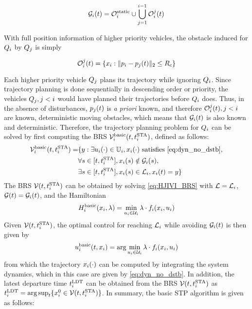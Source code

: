 \begin{equation}
\label{eq:obsseti}
\obsset_i(t)  = \soset_i \cup \bigcup_{j=1}^{i-1} \ioset_i^j(t)
\end{equation}

With full position information of higher priority vehicles, the obstacle induced for $Q_i$ by $Q_j$ is simply

\begin{equation}
\label{eq:ioset}
\ioset_i^j(t) = \{\state_i: \|\pos_i - \pos_j(t)\|_2 \le \rc \}
\end{equation}

Each higher priority vehicle $Q_j$ plans its trajectory while ignoring $Q_i$. Since trajectory planning is done sequentially in descending order or priority, the vehicles $Q_j, j<i$ would have planned their trajectories before $Q_i$ does. Thus, in the absence of disturbances, $p_j(t)$ is \textit{a priori} known, and therefore $\mathcal{O}_i^j(t), j<i$ are known, deterministic moving obstacles, which means that $\mathcal{G}_i(t)$ is also known and deterministic. Therefore, the trajectory planning problem for $Q_i$ can be solved by first computing the BRS $\mathcal{V}_i^\text{basic}(t, t^\text{STA}_i)$, defined as follows:
%
\begin{equation}
\label{eq:BRS_basic}
\begin{aligned}
\brs_i^\text{basic}(t, \sta_i) = & \{y: \exists \ctrl_i(\cdot) \in \cfset_i, \state_i(\cdot) \text{ satisfies \eqref{eq:dyn_no_dstb}}, \\
& \forall s \in [t, \sta_i],\state_i(s) \notin \obsset_i(s), \\
& \exists s \in [t, \sta_i], \state_i(s) \in \targetset_i, \state_i(t) = y\}
\end{aligned}
\end{equation}
%
The BRS $\mathcal{V}(t, t^\text{STA}_i)$ can be obtained by solving \eqref{eq:HJIVI_BRS} with $\mathcal{L} = \mathcal{L}_i$, $\mathcal{G}(t) = \mathcal{G}_i(t)$, and the Hamiltonian 
%
\begin{equation}
\label{eq:basicham}
\ham_i^\text{basic}(\state_i, \costate) = \min_{\ctrl_i\in\cset_i} \costate \cdot \fdyn_i(\state_i, \ctrl_i)
\end{equation}
%
 Given $\mathcal{V}(t, t^\text{STA}_i)$, the optimal control for reaching $\mathcal{L}_i$ while avoiding $\mathcal{G}_i(t)$ is then given by
%
\begin{equation}
\label{eq:basicOptCtrl}
\ctrl_i^\text{basic}(t, \state_i) = \arg \min_{\ctrl_i\in\cset_i} \costate \cdot \fdyn_i(\state_i, \ctrl_i)
\end{equation}
%
\noindent from which the trajectory $x_i(\cdot)$ can be computed by integrating the system dynamics, which in this case are given by \eqref{eq:dyn_no_dstb}. In addition, the latest departure time $t^\text{LDT}_i$ can be obtained from the BRS $\mathcal{V}(t, t^\text{STA}_i)$ as $t^\text{LDT}_i = \arg \sup_t \{x_i^0 \in \mathcal{V}(t, t^\text{STA}_i)\}$. In summary, the basic STP algorithm is given as follows:

